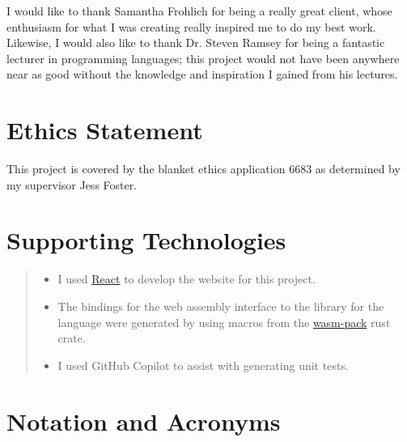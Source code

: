 I would like to thank Samantha Frohlich for being a really great client, whose enthusiasm for what I was creating really inspired me to do my best work. Likewise, I would also like to thank Dr. Steven Ramsey for being a fantastic lecturer in programming languages; this project would not have been anywhere near as good without the knowledge and inspiration I gained from his lectures. 

\makedecl
\makeaidecl
\tableofcontents
\listoffigures


\chapter*{Ethics Statement}
This project is covered by the blanket ethics application 6683 as determined by my supervisor Jess Foster. 


\chapter*{Supporting Technologies}
\label{chap:supporting_tech}

\begin{quote}
\noindent
\begin{itemize}
\item I used \href{https://react.dev/}{React} to develop the website for this project.
\item The bindings for the web assembly interface to the library for the language were generated by using macros from the \href{https://github.com/rustwasm/wasm-pack}{wasm-pack} rust crate.
\item I used GitHub Copilot to assist with generating unit tests.
\end{itemize}
\end{quote}


\chapter*{Notation and Acronyms}
\begin{acronym}
\end{acronym}
